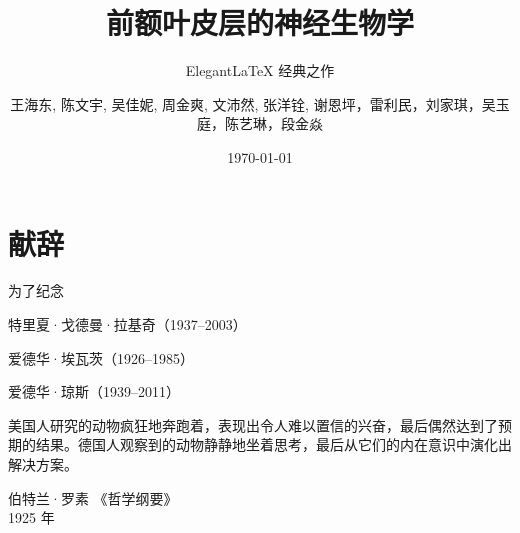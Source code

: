 \documentclass[cn,10pt,citestyle=gb7714-2015, bibstyle=gb7714-2015]{elegantbook}
\title{前额叶皮层的神经生物学}
\subtitle{Elegant\LaTeX{} 经典之作}
\author{王海东, 陈文宇, 吴佳妮, 周金爽, 文沛然, 张洋铨, 谢恩坪，雷利民，刘家琪，吴玉庭，陈艺琳，段金焱}
\institute{OpenHUTB}
\date{\today}
\begin{document}
\maketitle
\frontmatter

\chapter*{献辞}



\begin{center}
为了纪念

特里夏·戈德曼·拉基奇（1937–2003）

爱德华·埃瓦茨（1926–1985）

爱德华·琼斯（1939–2011）
\end{center}


\vskip 1.5cm

美国人研究的动物疯狂地奔跑着，表现出令人难以置信的兴奋，最后偶然达到了预期的结果。德国人观察到的动物静静地坐着思考，最后从它们的内在意识中演化出解决方案。


\vskip 0.5cm


\vskip 1.5cm

\begin{flushright}
伯特兰·罗素  《哲学纲要》\\
1925 年
\end{flushright}

\tableofcontents

\mainmatter















\nocite{*} 
\printbibliography
\end{document}
